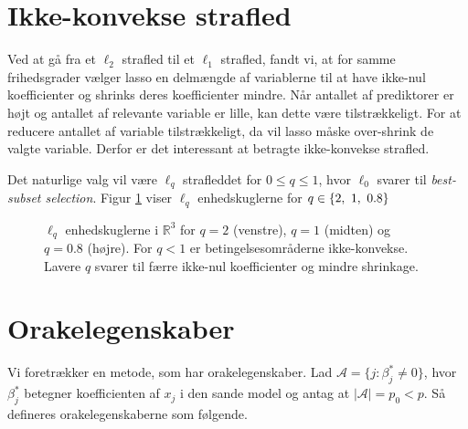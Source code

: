 \section{Ikke-konvekse strafled}
Ved at gå fra et \(\ell_2\) strafled til et \(\ell_1\) strafled, fandt vi, at for samme frihedsgrader vælger lasso en delmængde af variablerne til at have ikke-nul koefficienter og shrinks deres koefficienter mindre.
Når antallet af prediktorer er højt og antallet af relevante variable er lille, kan dette være tilstrækkeligt.
For at reducere antallet af variable tilstrækkeligt, da vil lasso måske over-shrink de valgte variable.
Derfor er det interessant at betragte ikke-konvekse strafled.

Det naturlige valg vil være \(\ell_q\) strafleddet for \(0 \leq q \leq 1\), hvor \(\ell_0\) svarer til \textit{best-subset selection}.
Figur \ref{fig:nonconvex_penalties} viser \(\ell_q\) enhedskuglerne for \(q \in \cbr{2, \ 1, \ 0.8}\)

%
\begin{figure}[H]
\centering
\caption{\(\ell_q\) enhedskuglerne i \(\mathbb{R}^3\) for \(q=2\) (venstre), \(q=1\) (midten) og \(q=0.8\) (højre). 
For \(q<1\) er betingelsesområderne ikke-konvekse. Lavere \(q\) svarer til færre ikke-nul koefficienter og mindre shrinkage.}
\label{fig:nonconvex_penalties}
\end{figure}
%


\section{Orakelegenskaber}
Vi foretrækker en metode, som har orakelegenskaber. Lad $\mathcal{A} =\{j:\beta_j^* \neq 0\}$, hvor $\beta_j^*$ betegner koefficienten af $x_j$ i den sande model og antag at $\vert \mathcal{A} \vert=p_0 <p$. Så defineres orakelegenskaberne som følgende. 

